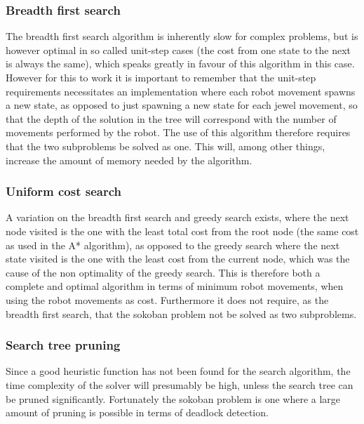 \subsubsection*{Breadth first search}
The breadth first search algorithm is inherently slow for complex problems, but is however optimal in so called unit-step cases (the cost from one state to the next is always the same), which speaks greatly in favour of this algorithm in this case. However for this to work it is important to remember that the unit-step requirements necessitates an implementation where each robot movement spawns a new state, as opposed to just spawning a new state for each jewel movement, so that the depth of the solution in the tree will correspond with the number of movements performed by the robot. The use of this algorithm therefore requires that the two subproblems be solved as one. This will, among other things, increase the amount of memory needed by the algorithm. 

\subsubsection*{Uniform cost search}
A variation on the breadth first search and greedy search exists, where the next node visited is the one with the least total cost from the root node (the same cost as used in the A* algorithm), as opposed to the greedy search where the next state visited is the one with the least cost from the current node, which was the cause of the non optimality of the greedy search. This is therefore both a complete and optimal algorithm in terms of minimum robot movements, when using the robot movements as cost. Furthermore it does not require, as the breadth first search, that the sokoban problem not be solved as two subproblems.

\subsubsection*{Search tree pruning}
Since a good heuristic function has not been found for the search algorithm, the time complexity of the solver will presumably be high, unless the search tree can be pruned significantly. Fortunately the sokoban problem is one where a large amount of pruning is possible in terms of deadlock detection. 

